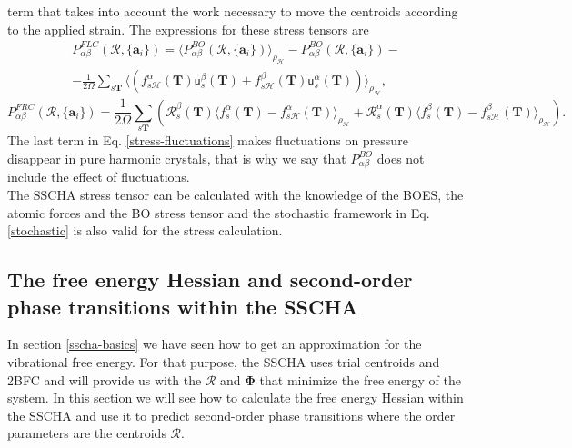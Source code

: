 term that takes into account the work necessary to move the centroids according to the applied strain. The expressions for these stress tensors are
\begin{multline}
 \label{stress-fluctuations}
 P_{\alpha\beta}^{FLC}(\boldsymbol{\mathcal{R}},\{\mathbf{a}_{i}\})=\langle P_{\alpha\beta}^{BO}(\boldsymbol{\mathcal{R}},\{\mathbf{a}_{i}\})\rangle_{\rho_{\mathcal{H}}}-
 P_{\alpha\beta}^{BO}(\boldsymbol{\mathcal{R}},\{\mathbf{a}_{i}\})- \\ -\frac{1}{2\Omega}\sum_{s\mathbf{T}}\langle(f_{s\mathcal{H}}^{\alpha}(\mathbf{T})\mathsf{u}_{s}^{\beta}(\mathbf{T})+
 f_{s\mathcal{H}}^{\beta}(\mathbf{T})\mathsf{u}_{s}^{\alpha}(\mathbf{T}))\rangle_{\rho_{\mathcal{H}}},
\end{multline}
\begin{equation}
 P_{\alpha\beta}^{FRC}(\boldsymbol{\mathcal{R}},\{\mathbf{a}_{i}\})=\frac{1}{2\Omega}\sum_{s\mathbf{T}}(\mathcal{R}_{s}^{\beta}(\mathbf{T})\langle f_{s}^{\alpha}(\mathbf{T})-f_{s\mathcal{H}}^{\alpha}(\mathbf{
 T})\rangle_{\rho_{\mathcal{H}}}+\mathcal{R}_{s}^{\alpha}(\mathbf{T})\langle f_{s}^{\beta}(\mathbf{T})-f_{s\mathcal{H}}^{\beta}(\mathbf{T})\rangle_{\rho_{\mathcal{H}}}).
\end{equation}
The last term in Eq. \ref{stress-fluctuations} makes fluctuations on pressure disappear in pure harmonic crystals\cite{monacelli2018pressure}, that is why we say that $P_{\alpha\beta}^{BO}$ does not include the effect
of fluctuations. \\

The SSCHA stress tensor can be calculated with the knowledge of the BOES, the atomic forces and the BO stress tensor and the stochastic framework in Eq. \ref{stochastic} is also valid for the stress calculation. 

\subsection{The free energy Hessian and second-order phase transitions within the SSCHA}
\label{free-energy-section}

In section \ref{sscha-basics} we have seen how to get an approximation for the vibrational free energy. For that purpose, the SSCHA uses trial centroids and 2BFC and will provide us with the $\boldsymbol{\mathcal{R}}$ 
and $\boldsymbol{\Phi}$ that minimize the free energy of the system. In this section we will see 
how to calculate the free energy Hessian within the SSCHA and use it to predict second-order phase transitions where the order parameters are the centroids $\boldsymbol{\mathcal{R}}$. \\

